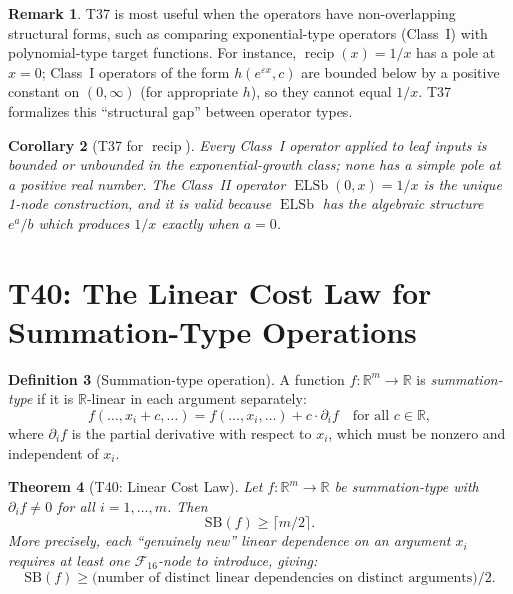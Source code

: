 \documentclass[12pt,a4paper]{article}
\newtheorem{theorem}{Theorem}[section]
\newtheorem{corollary}[theorem]{Corollary}
\theoremstyle{definition}
\newtheorem{definition}[theorem]{Definition}
\newtheorem{remark}[theorem]{Remark}
\newcommand{\ELSb}{\operatorname{ELSb}}
\newcommand{\F}{\mathcal{F}_{16}}
\newcommand{\SB}{\mathrm{SB}}
\newcommand{\recip}{\operatorname{recip}}
\begin{document}
\begin{remark}
T37 is most useful when the operators have non-overlapping structural forms,
such as comparing exponential-type operators (Class~I) with polynomial-type
target functions.  For instance, $\recip(x) = 1/x$ has a pole at $x=0$;
Class~I operators of the form $h(e^{\varepsilon x}, c)$ are bounded below by
a positive constant on $(0,\infty)$ (for appropriate $h$), so they cannot
equal $1/x$.  T37 formalizes this ``structural gap'' between operator types.
\end{remark}

\begin{corollary}[T37 for $\recip$]
Every Class~I operator applied to leaf inputs is bounded or unbounded in the
exponential-growth class; none has a simple pole at a positive real number.
The Class~II operator $\ELSb(0,x) = 1/x$ is the unique 1-node construction,
and it is valid because $\ELSb$ has the algebraic structure $e^a/b$ which
produces $1/x$ exactly when $a=0$.
\end{corollary}

\section{T40: The Linear Cost Law for Summation-Type Operations}
\label{sec:T40}

\begin{definition}[Summation-type operation]
A function $f:\mathbb{R}^m \to \mathbb{R}$ is \emph{summation-type} if it is
$\mathbb{R}$-linear in each argument separately:
\[
  f(\ldots, x_i + c, \ldots) = f(\ldots, x_i, \ldots) + c \cdot \partial_i f
  \quad\text{for all }c\in\mathbb{R},
\]
where $\partial_i f$ is the partial derivative with respect to $x_i$, which
must be nonzero and independent of $x_i$.
\end{definition}

\begin{theorem}[T40: Linear Cost Law]
\label{thm:T40}
Let $f:\mathbb{R}^m \to \mathbb{R}$ be summation-type with $\partial_i f \ne 0$
for all $i = 1, \ldots, m$.  Then
\[
  \SB(f) \ge \lceil m/2 \rceil.
\]
More precisely, each ``genuinely new'' linear dependence on an argument $x_i$
requires at least one $\F$-node to introduce, giving:
\[
  \SB(f) \ge \text{(number of distinct linear dependencies on distinct arguments)}/2.
\]
\end{theorem}
\end{document}
